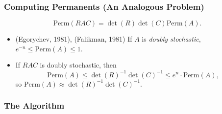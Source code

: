 \documentclass[usenames,dvipsnames,12pt]{beamer}
\begin{document}
\begin{frame}
    \frametitle{Computing Permanents (An Analogous Problem)}

    \[ \text{Perm}(RAC) = \det(R) \det(C) \text{Perm}(A). \]

    \begin{itemize}
        \pause
        \item (Egorychev, 1981), (Falikman, 1981) If $A$ is \emph{doubly stochastic}, $e^{-n} \leq \text{Perm}(A) \leq 1$.

        \pause
        \item If $RAC$ is doubly stochastic, then
        \[ \text{Perm}(A) \leq \det(R)^{-1} \det(C)^{-1} \leq e^n \cdot \text{Perm}(A), \]
        so $\text{Perm}(A) \approx \det(R)^{-1} \det(C)^{-1}$.
    \end{itemize}
\end{frame}





\begin{frame}
    \frametitle{The Algorithm}
\end{frame}
\end{document}

